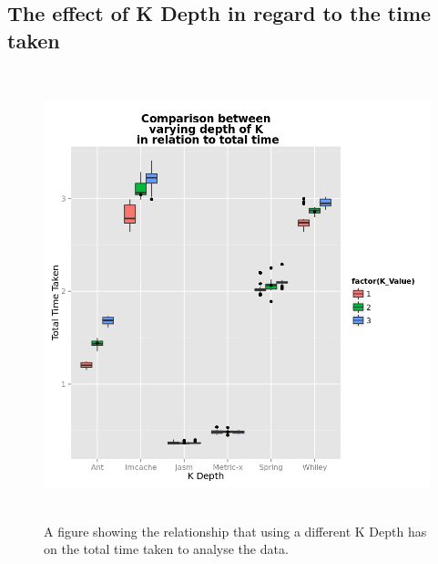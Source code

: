 \begin{appendices}
\chapter{The effect of K Depth in regard to the time taken}
\begin{figure}[h]
\centering
\includegraphics[width=\textwidth,height=13cm]{KDepthTime.png}
\caption{A figure showing the relationship that using a different K Depth has on the total time taken to analyse the data.}
\label{fig:kdepthtime}
\end{figure}


\end{appendices}
